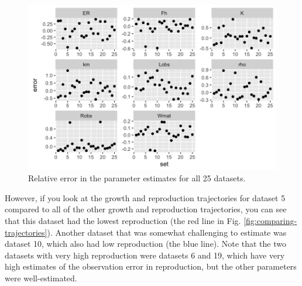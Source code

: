 \documentclass[12pt,reqno,final,pdftex]{amsart}\usepackage[]{graphicx}\usepackage[]{color}
\newenvironment{knitrout}{}{} %
\theoremstyle{plain}
\numberwithin{equation}{part}
\begin{document}
\begin{knitrout}\scriptsize
{}\color{fgcolor}\begin{figure}

\includegraphics[width=\linewidth]{figure/rel-error-25-2-1} \hfill{}

\caption[Relative error in the parameter estimates for all 25 datasets]{Relative error in the parameter estimates for all 25 datasets.}\label{fig:rel-error-25-2}
\end{figure}


\end{knitrout}

\clearpage

However, if you look at the growth and reproduction trajectories for dataset 5 compared to all of the other growth and reproduction trajectories, you can see that this dataset had the lowest reproduction (the red line in Fig. \ref{fig:comparing-trajectories}).
Another dataset that was somewhat challenging to estimate was dataset 10, which also had low reproduction (the blue line).
Note that the two datasets with very high reproduction were datasets 6 and 19, which have very high estimates of the observation error in reproduction, but the other parameters were well-estimated.
\end{document}
